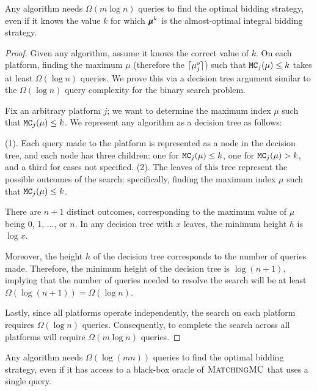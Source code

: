 \begin{theorem}\label{thm:lowerbound1}
Any algorithm needs $\Omega(m \log n)$ queries to find the optimal bidding strategy, even if it knows the value $k$ for which $\pmb{\mu}^k$ is the almost-optimal integral bidding strategy.
\end{theorem}
\begin{proof}
Given any algorithm, assume it knows the correct value of $ k $. On each platform, finding the maximum $ \mu $ (therefore the $\lceil\mu_j^o\rceil$) such that $ \texttt{MC}_j(\mu) \leq k $ takes at least $ \Omega(\log n) $ queries. We prove this via a decision tree argument similar to the $ \Omega(\log n) $ query complexity for the binary search problem. 

Fix an arbitrary platform $ j $; we want to determine the maximum index $ \mu $ such that $ \texttt{MC}_j(\mu) \leq k $. We represent any algorithm as a decision tree as follows:

(1). Each query made to the platform is represented as a node in the decision tree, and each node has three children: one for $ \texttt{MC}_j(\mu) \leq k $, one for $ \texttt{MC}_j(\mu) > k $, and a third for cases not specified.
(2). The leaves of this tree represent the possible outcomes of the search: specifically, finding the maximum index $\mu$ such that $\texttt{MC}_j(\mu) \leq k$.

There are $n + 1$ distinct outcomes, corresponding to the maximum value of $\mu$ being 0, 1, ..., or $ n$. In any decision tree with $x$ leaves, the minimum height $h$ is $\log x$. 

Moreover, the height $h$ of the decision tree corresponds to the number of queries made. Therefore, the minimum height of the decision tree is $\log(n + 1)$, implying that the number of queries needed to resolve the search will be at least $\Omega(\log(n + 1)) = \Omega(\log n)$. 

Lastly, since all platforms operate independently, the search on each platform requires $ \Omega(\log n)$ queries. Consequently, to complete the search across all platforms will require $ \Omega(m \log n) $ queries.
\end{proof}

\begin{theorem}\label{thm:lowerbound2}
Any algorithm needs $\Omega(\log (mn))$ queries to find the optimal bidding strategy, even if it has access to a black-box oracle of $\textsc{MatchingMC}$ that uses a single query. 
\end{theorem}

